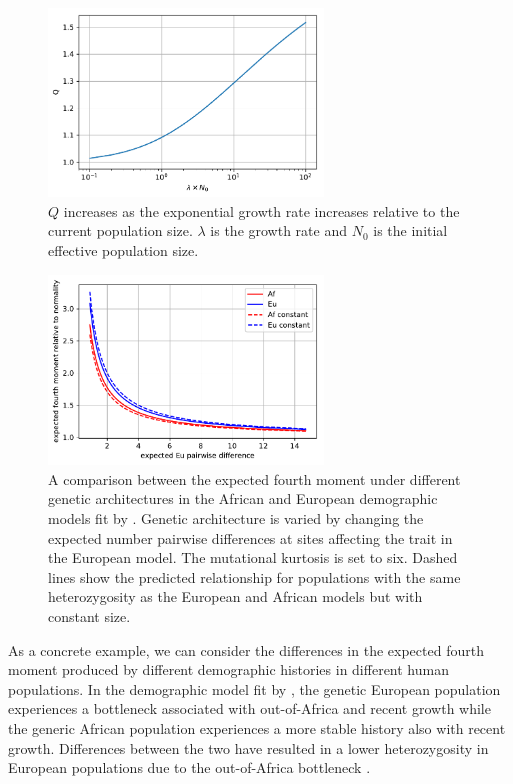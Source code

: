 \begin{figure}
\centering
\includegraphics[width=0.65\textwidth]{figures/exp_growth.pdf}
\caption{$Q$ increases as the exponential growth rate increases relative to the current
population size. $\lambda$ is the growth rate and $N_0$ is the initial effective population
size.}
\label{fig:Qexp}
\end{figure}

\begin{figure}
\centering
\includegraphics[width=0.65\textwidth]{figures/af_eu_kurt.pdf}
\caption{A comparison between the expected fourth moment under different genetic
architectures in the African and European demographic models fit
by \citet{Tennessen2012}. Genetic architecture is varied by changing the
expected number pairwise differences at sites affecting the trait in the
European model. The mutational kurtosis is set to six. Dashed lines show the
predicted relationship for populations with the same heterozygosity as the
European and African models but with constant size.}
\label{fig:afeucomp}
\end{figure}

As a concrete example, we can consider the differences in the expected fourth
moment produced by different demographic histories in different human
populations. In the demographic model fit by \citet{Tennessen2012}, the genetic
European population experiences a bottleneck associated with out-of-Africa and
recent growth while the generic African population experiences a more stable
history also with recent growth. Differences between the two have resulted in a
lower heterozygosity in European populations due to the out-of-Africa
bottleneck \citep{Yu2002}.

